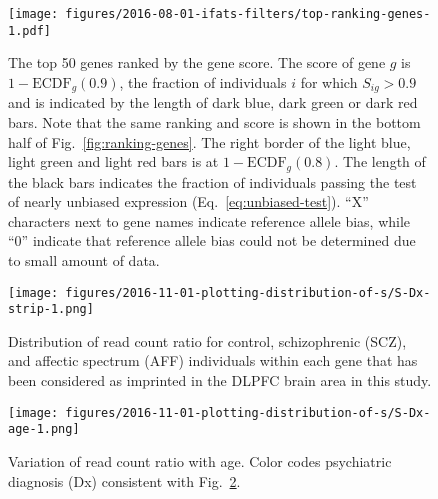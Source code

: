 \documentclass[letterpaper]{article}
\begin{document}
\begin{figure}[h]
\begin{center}
\texttt{[image: figures/2016-08-01-ifats-filters/top-ranking-genes-1.pdf]}
\caption{
The top 50 genes ranked by the gene score.  The score of gene \(g\) is \(1 -
\mathrm{ECDF}_g(0.9)\), the fraction of individuals \(i\) for which
\(S_{ig}>0.9\) and is indicated by the length of dark blue, dark green or dark
red bars.  Note that the same ranking and score is shown in the bottom half of
Fig.~\ref{fig:ranking-genes}.  The right border of the light blue, light green
and light red bars is at \(1 - \mathrm{ECDF}_g(0.8)\).  The length of the
black bars indicates the fraction of individuals passing the test of nearly
unbiased expression (Eq.~\ref{eq:unbiased-test}).  ``X'' characters next to
gene names indicate reference allele bias, while ``0'' indicate that
reference allele bias could not be determined due to small amount of data.
}
\label{fig:top-genes}
\end{center}
\end{figure}

\begin{figure}[h]
\begin{center}
\texttt{[image: figures/2016-11-01-plotting-distribution-of-s/S-Dx-strip-1.png]}
\caption{
Distribution of read count ratio for control, schizophrenic (SCZ), and
affectic spectrum (AFF) individuals within each gene that has been considered as imprinted in the DLPFC
brain area in this study.
}
\label{fig:S-Dx}
\end{center}
\end{figure}

\begin{figure}[h]
\begin{center}
\texttt{[image: figures/2016-11-01-plotting-distribution-of-s/S-Dx-age-1.png]}
\caption{
Variation of read count ratio with age.  Color codes psychiatric diagnosis
(Dx) consistent with Fig.~\ref{fig:S-Dx}.
}
\label{fig:S-age}
\end{center}
\end{figure}


\setcounter{table}{0}
\makeatletter 
\renewcommand{\thetable}{S\@arabic\c@table}
\makeatother
\end{document}
